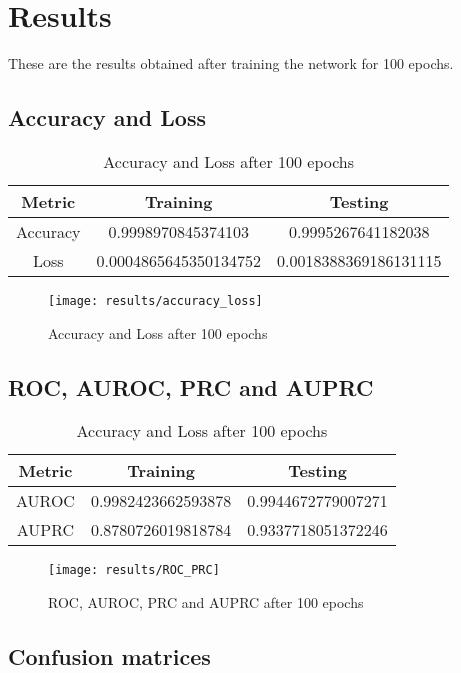 \chapter{Results}

These are the results obtained after training the network for 100 epochs.

\section{Accuracy and Loss}
\begin{table}
	\begin{tabular}{|c|c|c|}
		\hline
		\textbf{Metric} & \textbf{Training}     & \textbf{Testing}      \\
		\hline
		Accuracy        & 0.9998970845374103    & 0.9995267641182038    \\
		\hline
		Loss            & 0.0004865645350134752 & 0.0018388369186131115 \\
		\hline
	\end{tabular}
	\caption{Accuracy and Loss after 100 epochs}
\end{table}

\begin{figure}
	\texttt{[image: results/accuracy\_loss]}
	\caption{Accuracy and Loss after 100 epochs}
\end{figure}

\section{ROC, AUROC, PRC and AUPRC}
\begin{table}
	\begin{tabular}{|c|c|c|}
		\hline
		\textbf{Metric} & \textbf{Training}  & \textbf{Testing}   \\
		\hline
		AUROC           & 0.9982423662593878 & 0.9944672779007271 \\
		\hline
		AUPRC           & 0.8780726019818784 & 0.9337718051372246 \\
		\hline
	\end{tabular}
	\caption{Accuracy and Loss after 100 epochs}
\end{table}

\begin{figure}
	\texttt{[image: results/ROC\_PRC]}
	\caption{ROC, AUROC, PRC and AUPRC after 100 epochs}
\end{figure}

\section{Confusion matrices}

